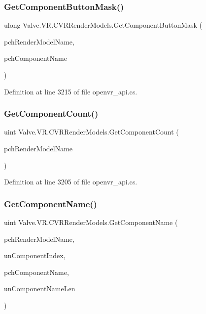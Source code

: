 \subsubsection{\texorpdfstring{GetComponentButtonMask()}{GetComponentButtonMask()}}
{\footnotesize\ttfamily ulong Valve.\+V\+R.\+C\+V\+R\+Render\+Models.\+Get\+Component\+Button\+Mask (\begin{DoxyParamCaption}\item[{string}]{pch\+Render\+Model\+Name,  }\item[{string}]{pch\+Component\+Name }\end{DoxyParamCaption})}



Definition at line 3215 of file openvr\+\_\+api.\+cs.

\mbox{\label{class_valve_1_1_v_r_1_1_c_v_r_render_models_a568ad8302d430ae46af582059489a5dd}} 
\subsubsection{\texorpdfstring{GetComponentCount()}{GetComponentCount()}}
{\footnotesize\ttfamily uint Valve.\+V\+R.\+C\+V\+R\+Render\+Models.\+Get\+Component\+Count (\begin{DoxyParamCaption}\item[{string}]{pch\+Render\+Model\+Name }\end{DoxyParamCaption})}



Definition at line 3205 of file openvr\+\_\+api.\+cs.

\mbox{\label{class_valve_1_1_v_r_1_1_c_v_r_render_models_aff8d40ef614d7ecfaadac708a7d4f04d}} 
\subsubsection{\texorpdfstring{GetComponentName()}{GetComponentName()}}
{\footnotesize\ttfamily uint Valve.\+V\+R.\+C\+V\+R\+Render\+Models.\+Get\+Component\+Name (\begin{DoxyParamCaption}\item[{string}]{pch\+Render\+Model\+Name,  }\item[{uint}]{un\+Component\+Index,  }\item[{System.\+Text.\+String\+Builder}]{pch\+Component\+Name,  }\item[{uint}]{un\+Component\+Name\+Len }\end{DoxyParamCaption})}



